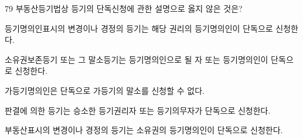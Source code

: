 \begin{question}{79}
부동산등기법상 등기의 단독신청에 관한 설명으로 옳지 않은 것은?
\begin{choices}
  \item 등기명의인표시의 변경이나 경정의 등기는 해당 권리의 등기명의인이 단독으로 신청한다.
  \item 소유권보존등기 또는 그 말소등기는 등기명의인으로 될 자 또는 등기명의인이 단독으로 신청한다.
  \item 가등기명의인은 단독으로 가등기의 말소를 신청할 수 없다.
  \item 판결에 의한 등기는 승소한 등기권리자 또는 등기의무자가 단독으로 신청한다.
  \item 부동산표시의 변경이나 경정의 등기는 소유권의 등기명의인이 단독으로 신청한다.
\end{choices}
\end{question}
